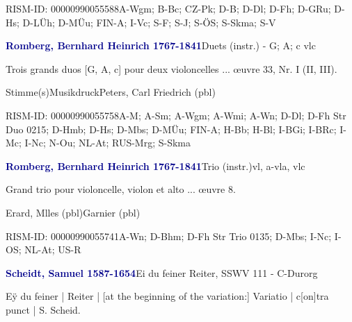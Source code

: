 \documentclass[twocolumn]{book}
\begin{document}
\par RISM-ID: 00000990055588\newline A-Wgm; B-Bc; CZ-Pk; D-B; D-Dl; D-Fh; D-GRu; D-Hs; D-LÜh; D-MÜu; FIN-A; I-Vc; S-F; S-J; S-ÖS; S-Skma; S-V
\par \vspace{7pt} \textcolor{darkblue}{\textbf{Romberg, Bernhard Heinrich  1767-1841}}\hfillplus{\textbf{[324]}}\newline Duets (instr.) - G; A; c vlc
\par \begin{itshape}Trois grands duos [G, A, c] pour deux violoncelles ... œuvre 33, Nr. I (II, III).\end{itshape} 
\par \textcolor{darkblue}{}  Stimme(s)\newline Musikdruck\newline Peters, Carl Friedrich  (pbl)
\par RISM-ID: 00000990055758\newline A-M; A-Sm; A-Wgm; A-Wmi; A-Wn; D-Dl; D-Fh  Str Duo 0215; D-Hmb; D-Hs; D-Mbs; D-MÜu; FIN-A; H-Bb; H-Bl; I-BGi; I-BRc; I-Mc; I-Nc; N-Ou; NL-At; RUS-Mrg; S-Skma
\par \vspace{7pt} \textcolor{darkblue}{\textbf{Romberg, Bernhard Heinrich  1767-1841}}\hfillplus{\textbf{[325]}}\newline Trio (instr.)\newline vl, a-vla, vlc
\par \begin{itshape}Grand trio pour violoncelle, violon et alto ... œuvre 8.\end{itshape} \newline Erard, Mlles  (pbl)\newline Garnier  (pbl)
\par RISM-ID: 00000990055741\newline A-Wn; D-Bhm; D-Fh  Str Trio 0135; D-Mbs; I-Nc; I-OS; NL-At; US-R
\par \vspace{7pt} \textcolor{darkblue}{\textbf{Scheidt, Samuel  1587-1654}}\hfillplus{\textbf{[326]}}\newline Ei du feiner Reiter, SSWV 111 - C-Dur\newline org
\par \begin{itshape}[f.91v, at left:] Eÿ du feiner | Reiter | [at the beginning of the variation:] Variatio | c[on]tra punct | S. Scheid.\end{itshape} 
\end{document}

